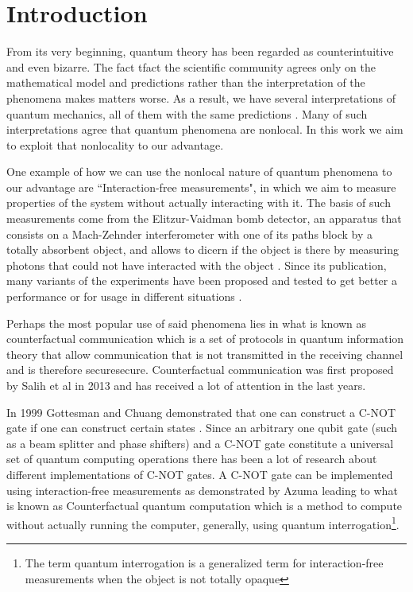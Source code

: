 \documentclass[12pt]{book}
\newcommand\blankpage{
    \null
    \thispagestyle{empty}
    \addtocounter{page}{0}
    \newpage
    }
\begin{document}
\pagebreak


\blankpage{}

\chapter*{Introduction}
\thispagestyle{plain}

From its very beginning, quantum theory has been regarded as counterintuitive and even bizarre. The fact tfact the scientific community agrees only on the mathematical model and predictions rather than the interpretation of the phenomena makes matters worse. As a result, we have several interpretations of quantum mechanics, all of them with the same predictions \cite{interpre}. Many of such interpretations agree that quantum phenomena are nonlocal. In this work we aim to exploit that nonlocality to our advantage.

One example of how we can use the nonlocal nature of quantum phenomena to our advantage are ``Interaction-free measurements", in which we aim to measure properties of the system without actually interacting with it. The basis of such measurements come from the Elitzur-Vaidman bomb detector, an apparatus that consists on a Mach-Zehnder interferometer with one of its paths block by a totally absorbent object, and allows to dicern if the object is there by measuring photons that could not have interacted with the object  \cite{Elitzur}. Since its publication, many variants of the experiments have been proposed and tested to get better a performance or for usage in different situations \cite{Azuma,exp,QI1,Azuma2018,electronic}.

Perhaps the most popular use of said phenomena lies in what is known as counterfactual communication which is a set of protocols in quantum information theory that allow communication that is not transmitted in the receiving channel and is therefore securesecure. Counterfactual communication was first proposed by Salih et al in 2013 \cite{CComunication} and has received a lot of attention in the last years.

In 1999 Gottesman and Chuang demonstrated that one can construct a C-NOT gate if one can construct certain states \cite{Gottesman}. Since an arbitrary one qubit gate (such as a beam splitter and phase shifters) and a C-NOT gate constitute a universal set of quantum computing operations \cite{chuang} there has been a lot of research about different implementations of C-NOT gates. A C-NOT gate can be implemented using interaction-free measurements as demonstrated by Azuma \cite{AzumaComputation} leading to what is known as Counterfactual quantum computation which is a method to compute without actually running the computer, generally, using quantum interrogation\footnote{The term quantum interrogation is a generalized term for interaction-free measurements when the object is not totally opaque}\cite{Hosten}.
\pagebreak
\end{document}
